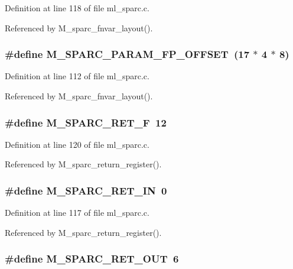 Definition at line 118 of file ml\_\-sparc.c.

Referenced by M\_\-sparc\_\-fnvar\_\-layout().
\subsubsection{\setlength{\rightskip}{0pt plus 5cm}\#define M\_\-SPARC\_\-PARAM\_\-FP\_\-OFFSET~(17 $\ast$ 4 $\ast$ 8)}\label{ml__sparc_8c_637642fac1f780208a67565e7f7c387b}




Definition at line 112 of file ml\_\-sparc.c.

Referenced by M\_\-sparc\_\-fnvar\_\-layout().
\subsubsection{\setlength{\rightskip}{0pt plus 5cm}\#define M\_\-SPARC\_\-RET\_\-F~12}\label{ml__sparc_8c_dde938197f9bfd51cd0aa467a438a27d}




Definition at line 120 of file ml\_\-sparc.c.

Referenced by M\_\-sparc\_\-return\_\-register().
\subsubsection{\setlength{\rightskip}{0pt plus 5cm}\#define M\_\-SPARC\_\-RET\_\-IN~0}\label{ml__sparc_8c_f3fef7d9337f99d07e58ef2b36592244}




Definition at line 117 of file ml\_\-sparc.c.

Referenced by M\_\-sparc\_\-return\_\-register().
\subsubsection{\setlength{\rightskip}{0pt plus 5cm}\#define M\_\-SPARC\_\-RET\_\-OUT~6}\label{ml__sparc_8c_034f8edf7f3577c3790e2384dde27210}




